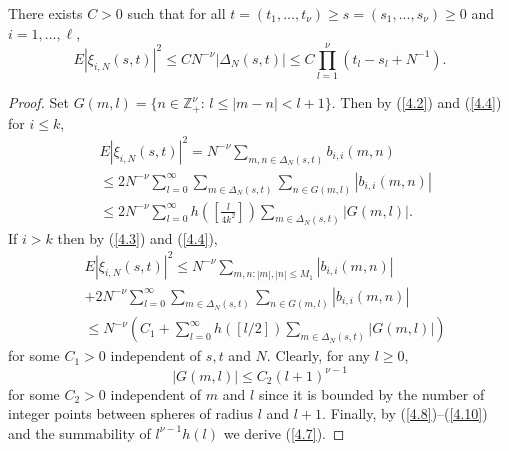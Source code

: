 \begin{lemma}\label{lem4.2} There exists $C>0$ such that for all $t=(t_1,...,
t_\nu)\geq s=(s_1,...,s_\nu)\geq 0$ and $i=1,...,\ell$,
\begin{equation}\label{4.7}
 E|\xi_{i,N}(s,t)|^2\le CN^{-\nu}|{{\Delta}}_N(s,t)|\le C\prod_{l=1}^\nu (t_l-s_l
 +N^{-1}).
\end{equation}
\end{lemma}
\begin{proof}
Set $G(m,l)=\{ n\in{{\mathbb Z}}_+^\nu:\, l\leq |m-n|<l+1\}$. Then by (\ref{4.2}) and
(\ref{4.4}) for $i\leq k$,
\begin{eqnarray}\label{4.8}
&E|\xi_{i,N}(s,t)|^2= N^{-\nu}\sum_{m,n\in{{\Delta}}_N(s,t)}b_{i,i}(m,n)\\
&\leq 2N^{-\nu}\sum^\infty_{l=0}\sum_{m\in{{\Delta}}_N(s,t)}\sum_{n\in G(m,l)}
|b_{i,i}(m,n)|\nonumber\\
&\leq 2N^{-\nu}\sum^\infty_{l=0}h([\frac l{4k^2}])\sum_{m\in{{\Delta}}_N(s,t)}
|G(m,l)|.
\nonumber
\end{eqnarray}
If $i>k$ then by (\ref{4.3}) and (\ref{4.4}),
\begin{eqnarray}\label{4.9}
&E|\xi_{i,N}(s,t)|^2\leq N^{-\nu}\sum_{m,n: |m|,|n|\leq M_1}|b_{i,i}(m,n)|\\
&+2N^{-\nu}\sum_{l=0}^\infty\sum_{m\in{{\Delta}}_N(s,t)}\sum_{n\in G(m,l)}
|b_{i,i}(m,n)|\nonumber\\
&\leq N^{-\nu}(C_1+\sum_{l=0}^\infty h([l/2])\sum_{m\in{{\Delta}}_N(s,t)}|G(m,l)|)
\nonumber\end{eqnarray}
for some $C_1>0$ independent of $s,t$ and $N$. Clearly, for any 
$l\geq 0$,
 \begin{equation}\label{4.10}
 |G(m,l)|\leq C_2(l+1)^{\nu-1}
 \end{equation}
 for some $C_2>0$ independent of $m$ and $l$ since it is bounded by the
 number of integer points between spheres of radius $l$ and $l+1$. Finally,
 by (\ref{4.8})--(\ref{4.10}) and the summability of $l^{\nu-1} h(l)$ we 
 derive (\ref{4.7}).
 \end{proof}
 

